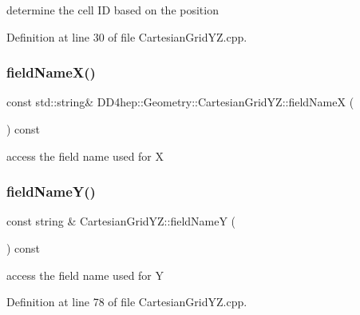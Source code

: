determine the cell ID based on the position 



Definition at line 30 of file Cartesian\+Grid\+Y\+Z.\+cpp.

\hypertarget{class_d_d4hep_1_1_geometry_1_1_cartesian_grid_y_z_a4a2d357e2409768d283e10882742d1d4}{}\label{class_d_d4hep_1_1_geometry_1_1_cartesian_grid_y_z_a4a2d357e2409768d283e10882742d1d4} 
\subsubsection{\texorpdfstring{field\+Name\+X()}{fieldNameX()}}
{\footnotesize\ttfamily const std\+::string\& D\+D4hep\+::\+Geometry\+::\+Cartesian\+Grid\+Y\+Z\+::field\+NameX (\begin{DoxyParamCaption}{ }\end{DoxyParamCaption}) const}



access the field name used for X 

\hypertarget{class_d_d4hep_1_1_geometry_1_1_cartesian_grid_y_z_a2364df2f32fbd8331cbdbf80886ca105}{}\label{class_d_d4hep_1_1_geometry_1_1_cartesian_grid_y_z_a2364df2f32fbd8331cbdbf80886ca105} 
\subsubsection{\texorpdfstring{field\+Name\+Y()}{fieldNameY()}}
{\footnotesize\ttfamily const string \& Cartesian\+Grid\+Y\+Z\+::field\+NameY (\begin{DoxyParamCaption}{ }\end{DoxyParamCaption}) const}



access the field name used for Y 



Definition at line 78 of file Cartesian\+Grid\+Y\+Z.\+cpp.

\hypertarget{class_d_d4hep_1_1_geometry_1_1_cartesian_grid_y_z_ae79873bbd9d6d0a5725c46e3efe1e60d}{}\label{class_d_d4hep_1_1_geometry_1_1_cartesian_grid_y_z_ae79873bbd9d6d0a5725c46e3efe1e60d} 
